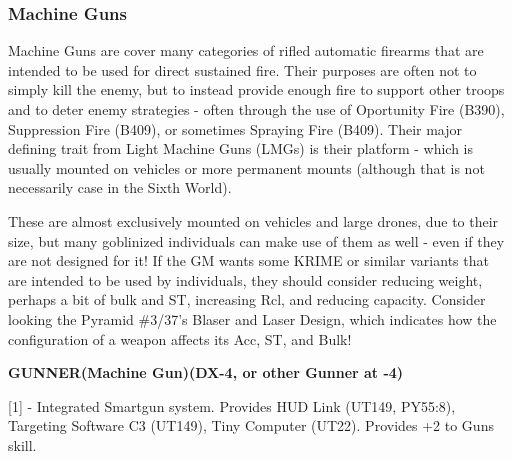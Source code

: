 \subsubsection{Machine Guns}

Machine Guns are cover many categories of rifled automatic firearms that are intended to be used for direct sustained fire. Their purposes are often not to simply kill the enemy, but to instead provide enough fire to support other troops and to deter enemy strategies - often through the use of Oportunity Fire (B390), Suppression Fire (B409), or sometimes Spraying Fire (B409). Their major defining trait from Light Machine Guns (LMGs) is their platform - which is usually mounted on vehicles or more permanent mounts (although that is not necessarily case in the Sixth World).

These are almost exclusively mounted on vehicles and large drones, due to their size, but many goblinized individuals can make use of them as well - even if they are not designed for it! If the GM wants some KRIME or similar variants that are intended to be used by individuals, they should consider reducing weight, perhaps a bit of bulk and ST, increasing Rcl, and reducing capacity. Consider looking the Pyramid \#3/37's Blaser and Laser Design, which indicates how the configuration of a weapon affects its Acc, ST, and Bulk!

\textbf{GUNNER(Machine Gun)(DX-4, or other Gunner at -4)}
\begin{center} 
	\begin{adjustwidth}{-8mm}{}
	\end{adjustwidth}
\end{center}

[1] - Integrated Smartgun system. Provides HUD Link (UT149, PY55:8), Targeting Software C3 (UT149), Tiny Computer (UT22). Provides +2 to Guns skill.

